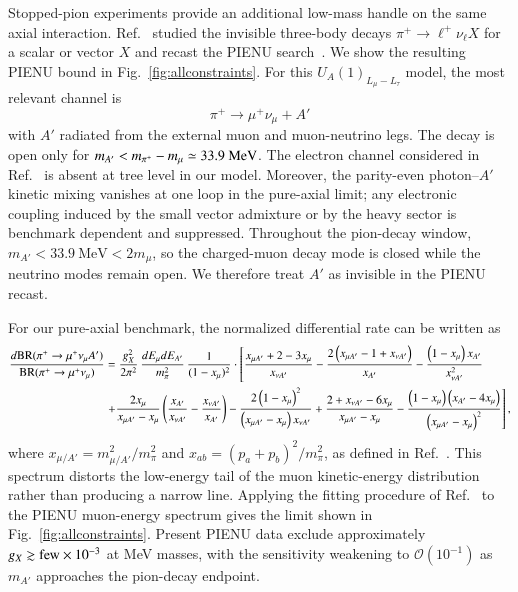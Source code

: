 \documentclass[onecolumn, aps, nofootinbib, prd, preprint, floats, floatfix, amsmath, amssymb, superscriptaddress, preprintnumbers]{revtex4-2}
\begin{document}
Stopped-pion experiments provide an additional low-mass handle on the same axial interaction. Ref.~\cite{Altmannshofer:2026opc} studied the invisible three-body decays $\pi^+\to \ell^+\nu_\ell X$ for a scalar or vector $X$ and recast the PIENU search~\cite{PIENU:2021clt}. We show the resulting PIENU bound in Fig.~\ref{fig:allconstraints}. For this $U_A(1)_{L_\mu-L_\tau}$ model, the most relevant channel is
\begin{equation}
    \pi^+\to \mu^+ \nu_\mu +A'
\end{equation}
with $A'$ radiated from the external muon and muon-neutrino legs. The decay is open only for $m_{A'}<m_{\pi^+}-m_\mu\simeq33.9~{\rm MeV}$. The electron channel considered in Ref.~\cite{Altmannshofer:2026opc} is absent at tree level in our model. Moreover, the parity-even photon--$A'$ kinetic mixing vanishes at one loop in the pure-axial limit; any electronic coupling induced by the small vector admixture or by the heavy sector is benchmark dependent and suppressed. Throughout the pion-decay window, $m_{A'}<33.9~\mathrm{MeV}<2m_\mu$, so the charged-muon decay mode is closed while the neutrino modes remain open. We therefore treat $A'$ as invisible in the PIENU recast.


For our pure-axial benchmark, the normalized differential rate can be written as \cite{Altmannshofer:2026opc}
\begin{equation}\label{eq:pion-axial-spectrum}
\small
\begin{aligned}
\frac{d{\rm BR}(\pi^+\to\mu^+\nu_\mu A')}
{{\rm BR}(\pi^+\to\mu^+\nu_\mu)}
&=\frac{g_X^2}{2\pi^2}\,
\frac{dE_\mu dE_{A'}}{m_\pi^2}\,
\frac{1}{(1-x_\mu)^2}\cdot \left[\frac{x_{\mu A'}+2-3 x_{\mu}}{x_{\nu A'}}-\frac{2\left(x_{\mu A'}-1+x_{\nu A'}\right)}{x_{A'}}-\frac{\left(1-x_{\mu}\right) x_{A'}}{x_{\nu A'}^2}\right.\\
& \left. +\frac{2 x_{\mu}}{x_{\mu A'}-x_{\mu}}\left(\frac{x_{A'}}{x_{\nu A'}}-\frac{x_{\nu A'}}{x_{A'}}\right) -\frac{2\left(1-x_{\mu}\right)^2}{\left(x_{\mu A'}-x_{\mu}\right) x_{\nu A'}}+\frac{2+x_{\nu A'}-6 x_{\mu}}{x_{\mu A'}-x_{\mu}}-\frac{\left(1-x_{\mu}\right)\left(x_{A'}-4 x_{\mu}\right)}{\left(x_{\mu A'}-x_{\mu}\right)^2}\right],
\end{aligned}
\end{equation}
where $x_{\mu/A'}=m_{\mu/A'}^2/m_\pi^2$ and $x_{ab}=(p_a+p_b)^2/m_\pi^2$, as defined in Ref.~\cite{Altmannshofer:2026opc}. This spectrum distorts the low-energy tail of the muon kinetic-energy distribution rather than producing a narrow line. Applying the fitting procedure of Ref.~\cite{Altmannshofer:2026opc} to the PIENU muon-energy spectrum gives the limit shown in Fig.~\ref{fig:allconstraints}. Present PIENU data exclude approximately $g_X\gtrsim{\rm few}\times10^{-3}$ at MeV masses, with the sensitivity weakening to $\mathcal O(10^{-1})$ as $m_{A'}$ approaches the pion-decay endpoint.
\end{document}
